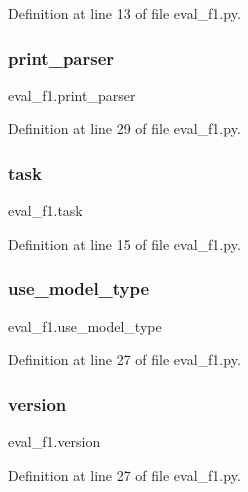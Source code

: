 Definition at line 13 of file eval\+\_\+f1.\+py.

\mbox{\label{namespaceeval__f1_ad7fc136d56e78943e93a7b24a2da36e6}} 
\subsubsection{\texorpdfstring{print\+\_\+parser}{print\_parser}}
{\footnotesize\ttfamily eval\+\_\+f1.\+print\+\_\+parser}



Definition at line 29 of file eval\+\_\+f1.\+py.

\mbox{\label{namespaceeval__f1_a6e79a8f9a4c48b767c1787f30ab85050}} 
\subsubsection{\texorpdfstring{task}{task}}
{\footnotesize\ttfamily eval\+\_\+f1.\+task}



Definition at line 15 of file eval\+\_\+f1.\+py.

\mbox{\label{namespaceeval__f1_aa7088a68c600d6d34816d9ec03d41d6b}} 
\subsubsection{\texorpdfstring{use\+\_\+model\+\_\+type}{use\_model\_type}}
{\footnotesize\ttfamily eval\+\_\+f1.\+use\+\_\+model\+\_\+type}



Definition at line 27 of file eval\+\_\+f1.\+py.

\mbox{\label{namespaceeval__f1_adec39e598f14f69ec4db14205bdb170c}} 
\subsubsection{\texorpdfstring{version}{version}}
{\footnotesize\ttfamily eval\+\_\+f1.\+version}



Definition at line 27 of file eval\+\_\+f1.\+py.

